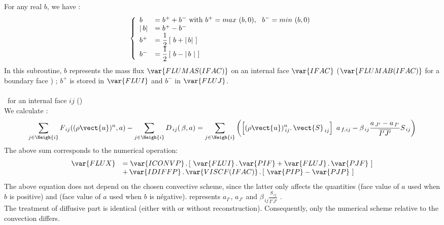 For any real $b$, we have :
\begin{equation}\notag
\left\{\begin{array}{lll}
 b &= b^{+} + b^{-} \text{  with  } b^{+} = max\  (b,0),\ \ b^{-} = min\  (b,0)\\
|\,b |&= b^{+} - b^{-}\\
b^{+}& =\displaystyle\frac{1}{2}\,[\ b + |\,b |\ ]\\
b^{-}& =\displaystyle\frac{1}{2}\,[\ b - |\,b\ |\ ]\\
\end{array}\right.
\end{equation}
In this subroutine, $b$ represents the mass flux $\var{FLUMAS(IFAC)}$
on an internal face $\var{IFAC}$ ($\var{FLUMAB(IFAC)}$ for a boundary face ) 
; $b^{+}$ is stored in $\var{FLUI}$ and $b^{-}$ in $\var{FLUJ}$.\\\\
\hspace*{1cm}{\tiny$\blacksquare$}\, for an internal face $ij$ ()\\
We calculate :
\begin{equation}\notag
\sum_{j\in \Neigh{i}}{F_{\,ij}((\rho \vect{u})^n, a)}
- \sum_{j\in \Neigh{i}}{D_{\,ij}(\,\beta, a)}\\
= \sum_{j\in \Neigh{i}}\displaystyle\left({ \left[{(\rho \vect{u})_{\,ij}^n} \text{.}\,
\vect{S}_{\,ij}\right]\ a_{\,f,ij}
- \beta_{\,ij}\frac{a_{\,J'}- a_{\,I'}}{\overline{I'J'}} S_{\,ij}}\right)
\end{equation}
The above sum corresponds to the numerical operation:
\begin{equation}\label{Base_Bilsc2_eq_flux_interne}
\begin{array}{ll}
\var{FLUX}& = \var{ICONVP} \,.\,[\ \var{FLUI}\,.\, \var{PIF} + \var{FLUJ}\,.\, \var{PJF}\ ]\\
&+\,\var{IDIFFP}\,.\,\var{VISCF(IFAC)}\,.\,[\ \var{PIP} - \var{PJP}\ ]
\end{array}
\end{equation}
The above equation does not depend on the chosen convective scheme, since the latter only affects the quantities   (face value of $a$ used
when $b$ is positive) and  (face value of $a$ used
when $b$ is n\'egative).  represents $a_{I'}$,  $a_{J'}$ and 
 $ \beta_{\,ij} \displaystyle \frac{S_{\,ij}}{\overline{I'J'}}$  .\\
The treatment of diffusive part is identical (either with or without reconstruction). Consequently, only the numerical scheme relative to the convection differs.\\\\
